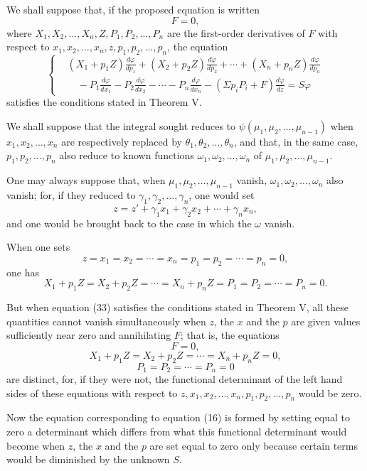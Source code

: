 \documentclass[11pt]{article}
\begin{document}
We shall suppose that, if the proposed equation is written
\[
F=0,
\]
where $X_1,X_2,\ldots,X_n,Z,P_1,P_2,\ldots,P_n$ are the first-order derivatives of $F$ with respect to $x_1,x_2,\ldots,x_n,z,p_1,p_2,\ldots,p_n$, the equation
\begin{equation*}\tag{33}
\left\{
\begin{aligned}
&(X_1+p_1Z)\frac{d\varphi}{dp_1}+(X_2+p_2Z)\frac{d\varphi}{dp_2}+\cdots+(X_n+p_nZ)\frac{d\varphi}{dp_n}\\
&\quad-P_1\frac{d\varphi}{dx_1}-P_2\frac{d\varphi}{dx_2}-\cdots-P_n\frac{d\varphi}{dx_n}-(\Sigma p_iP_i+F)\frac{d\varphi}{dz}=S\varphi
\end{aligned}
\right.
\end{equation*}
satisfies the conditions stated in Theorem V.

We shall suppose that the integral sought reduces to $\psi(\mu_1,\mu_2,\ldots,\mu_{n-1})$ when $x_1,x_2,\ldots,x_n$ are respectively replaced by $\theta_1,\theta_2,\ldots,\theta_n$, and that, in the same case, $p_1,p_2,\ldots,p_n$ also reduce to known functions $\omega_1,\omega_2,\ldots,\omega_n$ of $\mu_1,\mu_2,\ldots,\mu_{n-1}$.

One may always suppose that, when $\mu_1,\mu_2,\ldots,\mu_{n-1}$ vanish, $\omega_1,\omega_2,\ldots,\omega_n$ also vanish; for, if they reduced to $\gamma_1,\gamma_2,\ldots,\gamma_n$, one would set
\[
z=z'+\gamma_1x_1+\gamma_2x_2+\cdots+\gamma_nx_n,
\]
and one would be brought back to the case in which the $\omega$ vanish.

When one sets
\[
z=x_1=x_2=\cdots=x_n=p_1=p_2=\cdots=p_n=0,
\]
one has
\[
X_1+p_1Z=X_2+p_2Z=\cdots=X_n+p_nZ=P_1=P_2=\cdots=P_n=0.
\]

But when equation (33) satisfies the conditions stated in Theorem V, all these quantities cannot vanish simultaneously when $z$, the $x$ and the $p$ are given values sufficiently near zero and annihilating $F$; that is, the equations
\[
F=0,
\]
\[
X_1+p_1Z=X_2+p_2Z=\cdots=X_n+p_nZ=0,
\]
\[
P_1=P_2=\cdots=P_n=0
\]
are distinct, for, if they were not, the functional determinant of the left hand sides of these equations with respect to $z,x_1,x_2,\ldots,x_n,p_1,p_2,\ldots,p_n$ would be zero.

Now the equation corresponding to equation (16) is formed by setting equal to zero a determinant which differs from what this functional determinant would become when $z$, the $x$ and the $p$ are set equal to zero only because certain terms would be diminished by the unknown $S$.
\end{document}
